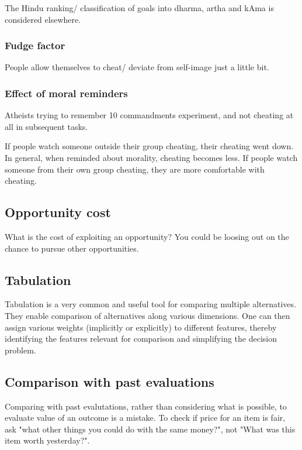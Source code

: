 \documentclass[oneside, article]{memoir}
\begin{document}
The Hindu ranking/ classification of goals into dharma, artha and kAma is considered elsewhere. 

\subsubsection{Fudge factor}
People allow themselves to cheat/ deviate from self-image just a little bit.

\subsubsection{Effect of moral reminders}
Atheists trying to remember 10 commandments experiment, and not cheating at all in subsequent tasks.

If people watch someone outside their group cheating, their cheating went down. In general, when reminded about morality, cheating becomes less.  If people watch someone from their own group cheating, they are more comfortable with cheating.

\subsection{Opportunity cost}
What is the cost of exploiting an opportunity? You could be loosing out on the chance to pursue other opportunities.

\subsection{Tabulation}
Tabulation is a very common and useful tool for comparing multiple alternatives. They enable comparison of alternatives along various dimensions. One can then assign various weights (implicitly or explicitly) to different features, thereby identifying the features relevant for comparison and simplifying the decision problem.


\subsection{Comparison with past evaluations}
Comparing with past evalutations, rather than considering what is possible, to evaluate value of an outcome is a mistake. To check if price for an item is fair, ask "what other things you could do with the same money?", not "What was this item worth yesterday?".
\end{document}
